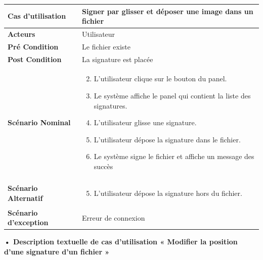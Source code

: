 \begin{longtable}{|p{5cm}|p{10cm}|}
\hline
\textbf{Cas d'utilisation}&Signer par glisser et déposer une image dans un fichier\\
\hline
\textbf{Acteurs}&Utilisateur\\
\hline
\textbf{Pré Condition}&Le fichier existe\\
\hline
\textbf{Post Condition}&La signature est placée\\
\hline
\textbf{Scénario Nominal}&
\vspace{-\baselineskip}
\begin{enumerate}
    \setcounter{enumi}{1}
    \item L'utilisateur clique sur le bouton du panel.
    \item Le système affiche le panel qui contient la liste des signatures.
    \item L'utilisateur glisse une signature.
    \item L'utilisateur dépose la signature dans le fichier.
    \item Le système signe le fichier et affiche un message des succès
    
\end{enumerate}\\
\hline
\textbf{Scénario Alternatif}&
\vspace{-\baselineskip}
\begin{enumerate}
    \setcounter{enumi}{4}
    \item L'utilisateur dépose la signature hors du fichier.
\end{enumerate}\\
\hline
\textbf{Scénario d'exception}&Erreur de connexion\\
\hline
\end{longtable}


\textbf{•	Description textuelle de cas d'utilisation « Modifier la position d'une signature d'un fichier »}

